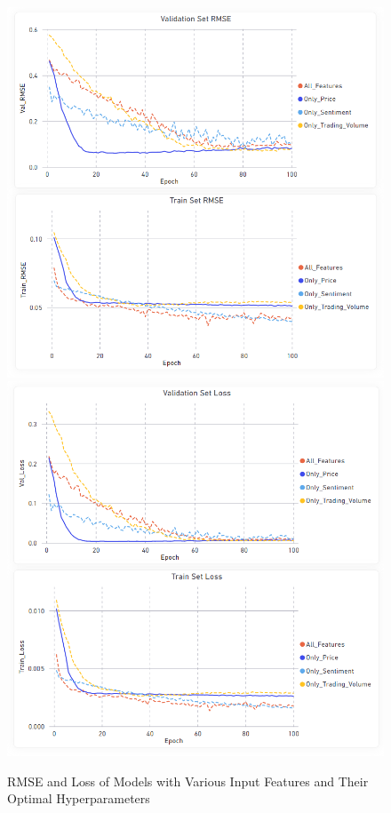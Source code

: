 \documentclass[11pt, a4paper]{article}
\begin{document}
\begin{figure}
    \centering
    \includegraphics[scale = 0.55]{Best_Params_Of_Model_RMSE.png}
    \includegraphics[scale = 0.55]{Best_Params_Of_Model_Loss.png}
    \caption{RMSE and Loss of Models with Various Input Features and Their Optimal Hyperparameters}
    \label{fig:lstm_models_rmse_loss}
\end{figure}
\end{document}
